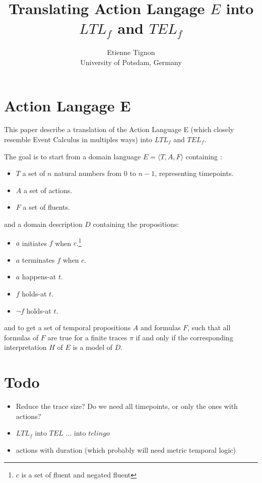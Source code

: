 \documentclass[a4paper]{article}
\begin{document}
\title{Translating Action Langage $E$ into $LTL_f$ and $TEL_f$}

\author{%
  Etienne Tignon\\
  University of Potsdam, Germany
}

\maketitle

\section{Action Langage E}
This paper describe a translation of the Action Language E (which closely resemble Event Calculus in multiples ways) into $LTL_f$ and $TEL_f$.

The goal is to start from a domain language $E=\langle T,A,F\rangle$ containing :
\begin{itemize}
  \item $T$ a set of $n$ natural numbers from $0$ to $n-1$, representing timepoints.
  \item $A$ a set of actions.
  \item $F$ a set of fluents.
\end{itemize}
and a domain description $D$ containing the propositions:
\begin{itemize}
  \item $a$ initiates $f$ when $c$.\footnote{$c$ is a set of fluent and negated fluent}
  \item $a$ terminates $f$ when $c$.\footnotemark[1]
  \item $a$ happens-at $t$.
  \item $f$ holds-at $t$.
  \item $\neg f$ holds-at $t$.
\end{itemize}

and to get a set of temporal propositions $A$ and formulas $F$, such that all formulas of $F$ are true for a finite traces $\pi$ if and only if the corresponding interpretation $H$ of $E$ is a model of $D$.





%
%
%
%
%

\section{Todo}

\begin{itemize}
  \item Reduce the trace size? Do we need all timepoints, or only the ones with actions?
  \item $LTL_f$ into $TEL$ ... into $telingo$
  \item actions with duration (which probably will need metric temporal logic)
\end{itemize}

\printbibliography{}
\end{document}
